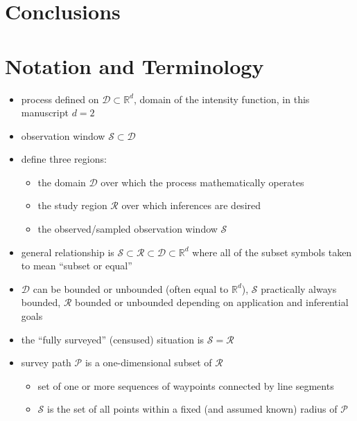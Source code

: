 \documentclass[review]{elsarticle}
\begin{document}
\section{Conclusions}


\appendix
\section{Notation and Terminology}

\begin{itemize}

\item process defined on \(\mathcal{D} \subset \mathbb{R}^{d}\), domain of the
intensity function, in this manuscript \(d = 2\)

\item observation window \(\mathcal{S} \subset \mathcal{D}\)

\item define three regions:
\begin{itemize}
\item the domain \(\mathcal{D}\) over which the process mathematically operates
\item the study region \(\mathcal{R}\) over which inferences are desired
\item the observed/sampled observation window \(\mathcal{S}\)
\end{itemize}

\item general relationship is \(\mathcal{S} \subset \mathcal{R}
\subset \mathcal{D} \subset \mathbb{R}^{d}\) where all of the subset symbols
taken to mean ``subset or equal''

\item \(\mathcal{D}\) can be bounded or unbounded (often equal to
\(\mathbb{R}^{d}\)), $\mathcal{S}$ practically always bounded, \(\mathcal{R}\)
bounded or unbounded depending on application and inferential goals

\item the ``fully surveyed'' (censused) situation is
\(\mathcal{S} = \mathcal{R}\)

\item survey path \(\mathcal{P}\) is a one-dimensional subset of
\(\mathcal{R}\)
\begin{itemize}
\item set of one or more sequences of waypoints connected by line segments
\item \(\mathcal{S}\) is the set of all points within a fixed (and assumed
known) radius of \(\mathcal{P}\)
\end{itemize}


\end{itemize}
\end{document}
